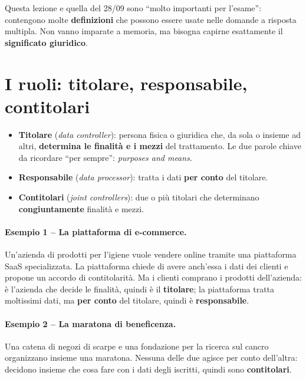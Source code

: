 \begin{esame}
Questa lezione e quella del 28/09 sono ``molto importanti per l'esame'': contengono molte
\textbf{definizioni} che possono essere usate nelle domande a risposta multipla. Non vanno imparate a
memoria, ma bisogna capirne esattamente il \textbf{significato giuridico}.
\end{esame}

\section{I ruoli: titolare, responsabile, contitolari}
\begin{itemize}
  \item \textbf{Titolare} (\emph{data controller}): persona fisica o giuridica che, da sola o insieme
    ad altri, \textbf{determina le finalità e i mezzi} del trattamento. Le due parole chiave da
    ricordare ``per sempre'': \emph{purposes and means}.
  \item \textbf{Responsabile} (\emph{data processor}): tratta i dati \textbf{per conto} del titolare.
  \item \textbf{Contitolari} (\emph{joint controllers}): due o più titolari che determinano
    \textbf{congiuntamente} finalità e mezzi.
\end{itemize}

\paragraph{Esempio 1 -- La piattaforma di e-commerce.} Un'azienda di prodotti per l'igiene vuole
vendere online tramite una piattaforma SaaS specializzata. La piattaforma chiede di avere anch'essa i
dati dei clienti e propone un accordo di contitolarità. Ma i clienti comprano i prodotti dell'azienda:
è l'azienda che decide le finalità, quindi è il \textbf{titolare}; la piattaforma tratta moltissimi
dati, ma \textbf{per conto} del titolare, quindi è \textbf{responsabile}.

\paragraph{Esempio 2 -- La maratona di beneficenza.} Una catena di negozi di scarpe e una fondazione
per la ricerca sul cancro organizzano insieme una maratona. Nessuna delle due agisce per conto
dell'altra: decidono insieme che cosa fare con i dati degli iscritti, quindi sono
\textbf{contitolari}.

